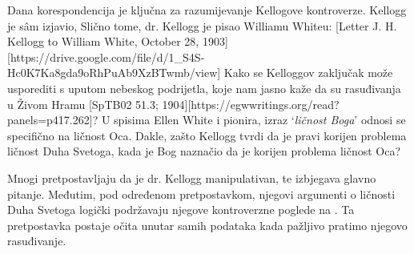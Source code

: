 Dana korespondencija je ključna za razumijevanje Kellogove kontroverze. Kellogg je sâm izjavio,  Slično tome, dr. Kellogg je pisao Williamu Whiteu: [Letter J. H. Kellogg to William White, October 28, 1903][https://drive.google.com/file/d/1\_S4S-Hc0K7Ka8gda9oRhPuAb9XzBTwmb/view] Kako se Kelloggov zaključak može usporediti s uputom nebeskog podrijetla, koje nam jasno kaže da su rasuđivanja u Živom Hramu [SpTB02 51.3; 1904][https://egwwritings.org/read?panels=p417.262]? U spisima Ellen White i pionira, izraz ‘\textit{ličnost Boga}’ odnosi se specifično na ličnost Oca. Dakle, zašto Kellogg tvrdi da je pravi korijen problema ličnost Duha Svetoga, kada je Bog naznačio da je korijen problema ličnost Oca?

Mnogi pretpostavljaju da je dr. Kellogg manipulativan, te izbjegava glavno pitanje. Međutim, pod određenom pretpostavkom, njegovi argumenti o ličnosti Duha Svetoga logički podržavaju njegove kontroverzne poglede na . Ta pretpostavka postaje očita unutar samih podataka kada pažljivo pratimo njegovo rasuđivanje.


